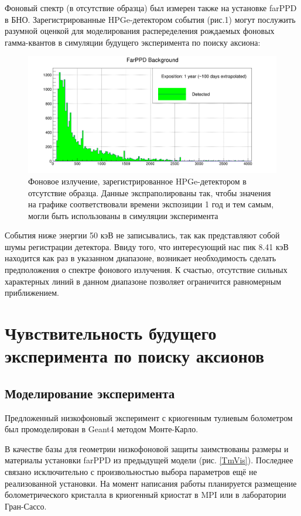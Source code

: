 \documentclass[a4paper,article,14pt]{extarticle}
\begin{document}
    Фоновый спектр (в отсутствие образца) был измерен также на установке farPPD в БНО. Зарегистрированные HPGe-детектором события (рис.1) могут послужить разумной оценкой для моделирования распеределения рождаемых фоновых гамма-квантов в симуляции будущего эксперимента по поиску аксиона:
    
    \begin{figure}[h]
    \centering
    \includegraphics[width = \textwidth]{images/FarPPD_background.png}
    \caption{Фоновое излучение, зарегистрированное HPGe-детектором в отсутствие образца. Данные экспраполированы так, чтобы значения на графике соответствовали времени экспозиции 1 год и тем самым, могли быть использованы в симуляции эксперимента}
    \label{fon}
\end{figure}
    
    События ниже энергии 50 кэВ не записывались, так как представляют собой шумы регистрации детектора. Ввиду того, что интересующий нас пик 8.41 кэВ находится как раз в указанном диапазоне, возникает необходимость сделать предположения о спектре фонового излучения. К счастью, отсутствие сильных характерных линий в данном диапазоне позволяет ограничится равномерным приближением.
    
\section{Чувствительность будущего эксперимента по поиску аксионов}

\subsection{Моделирование эксперимента}

Предложенный низкофоновый эксперимент с криогенным тулиевым болометром был промоделирован в Geant4 методом Монте-Карло. 

В качестве базы для геометрии низкофоновой защиты заимствованы размеры и материалы установки farPPD из предыдущей модели (рис. \ref{TmVis}). Последнее связано исключительно с произвольностью выбора параметров ещё не реализованной установки. На момент написания работы планируется размещение болометрического кристалла в криогенный криостат в MPI или в лаборатории Гран-Сассо.
\end{document}
